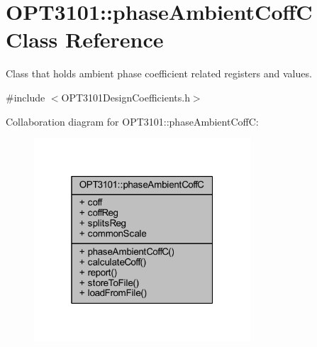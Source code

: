 \hypertarget{class_o_p_t3101_1_1phase_ambient_coff_c}{}\section{O\+P\+T3101\+:\+:phase\+Ambient\+CoffC Class Reference}
\label{class_o_p_t3101_1_1phase_ambient_coff_c}


Class that holds ambient phase coefficient related registers and values.  




{\ttfamily \#include $<$O\+P\+T3101\+Design\+Coefficients.\+h$>$}



Collaboration diagram for O\+P\+T3101\+:\+:phase\+Ambient\+CoffC\+:\nopagebreak
\begin{figure}[H]
\begin{center}
\leavevmode
\includegraphics[width=229pt]{class_o_p_t3101_1_1phase_ambient_coff_c__coll__graph}
\end{center}
\end{figure}
